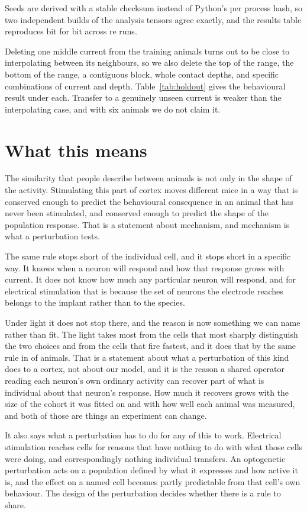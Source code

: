 \documentclass[11pt,letterpaper]{article}
\begin{document}
Seeds are derived with a stable checksum instead of Python's per process hash, so two
independent builds of the analysis tensors agree exactly, and the results table
reproduces bit for bit across re runs.

Deleting one middle current from the training animals turns out to be close to
interpolating between its neighbours, so we also delete the top of the range, the
bottom of the range, a contiguous block, whole contact depths, and specific
combinations of current and depth. Table~\ref{tab:holdout} gives the behavioural
result under each. Transfer to a genuinely unseen current is weaker than the
interpolating case, and with six animals we do not claim it.

\section{What this means}

The similarity that people describe between animals is not only in the shape of the
activity. Stimulating this part of cortex moves different mice in a way that is
conserved enough to predict the behavioural consequence in an animal that has never
been stimulated, and conserved enough to predict the shape of the population response.
That is a statement about mechanism, and mechanism is what a perturbation tests.

The same rule stops short of the individual cell, and it stops short in a specific way.
It knows when a neuron will respond and how that response grows with current. It does
not know how much any particular neuron will respond, and for electrical stimulation
that is because the set of neurons the electrode reaches belongs to the implant rather
than to the species.

Under light it does not stop there, and the reason is now something we can name rather
than fit. The light takes most from the cells that most sharply distinguish the two
choices and from the cells that fire fastest, and it does that by the same rule in
\RuleSelNeg{} of \RuleSelN{} animals. That is a statement about what a perturbation of
this kind does to a cortex, not about our model, and it is the reason a shared operator
reading each neuron's own ordinary activity can recover part of what is individual about
that neuron's response. How much it recovers grows with the size of the cohort it was
fitted on and with how well each animal was measured, and both of those are things an
experiment can change.

It also says what a perturbation has to do for any of this to work. Electrical
stimulation reaches cells for reasons that have nothing to do with what those cells were
doing, and correspondingly nothing individual transfers. An optogenetic perturbation
acts on a population defined by what it expresses and how active it is, and the effect
on a named cell becomes partly predictable from that cell's own behaviour. The design of
the perturbation decides whether there is a rule to share.
\end{document}
